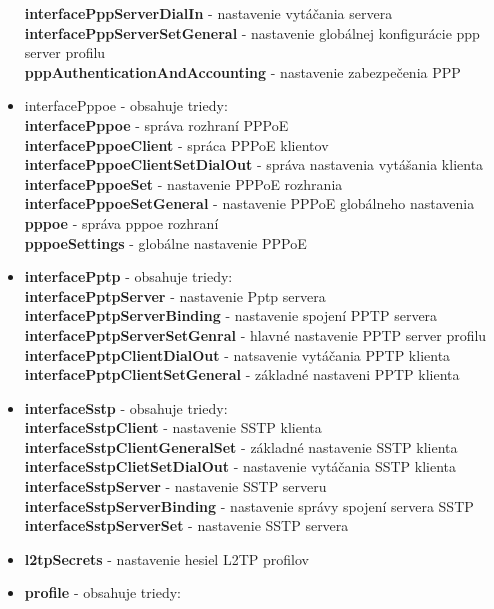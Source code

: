 \begin{itemize}
\textbf{interfacePppServerDialIn} - nastavenie vytáčania servera\\
\textbf{interfacePppServerSetGeneral} - nastavenie globálnej konfigurácie ppp server profilu\\
\textbf{pppAuthenticationAndAccounting} - nastavenie zabezpečenia PPP
\item interfacePppoe - obsahuje triedy:\\
\textbf{interfacePppoe} - správa rozhraní PPPoE\\
\textbf{interfacePppoeClient} - spráca PPPoE klientov\\
\textbf{interfacePppoeClientSetDialOut} - správa nastavenia vytášania klienta\\
\textbf{interfacePppoeSet} - nastavenie PPPoE rozhrania\\
\textbf{interfacePppoeSetGeneral} - nastavenie PPPoE globálneho nastavenia\\
\textbf{pppoe} - správa pppoe rozhraní\\
\textbf{pppoeSettings} - globálne nastavenie PPPoE
\item \textbf{interfacePptp} - obsahuje triedy:\\
\textbf{interfacePptpServer} - nastavenie Pptp servera\\
\textbf{interfacePptpServerBinding} - nastavenie spojení PPTP servera\\
\textbf{interfacePptpServerSetGenral} - hlavné nastavenie PPTP server profilu\\
\textbf{interfacePptpClientDialOut} - natsavenie vytáčania PPTP klienta\\
\textbf{interfacePptpClientSetGeneral} - základné  nastaveni PPTP klienta
\item \textbf{interfaceSstp} - obsahuje triedy:\\
\textbf{interfaceSstpClient} - nastavenie SSTP klienta\\
\textbf{interfaceSstpClientGeneralSet} - základné nastavenie SSTP klienta\\
\textbf{interfaceSstpClietSetDialOut} - nastavenie vytáčania SSTP klienta\\
\textbf{interfaceSstpServer} - nastavenie SSTP serveru\\
\textbf{interfaceSstpServerBinding} - nastavenie správy spojení servera SSTP\\
\textbf{interfaceSstpServerSet} - nastavenie SSTP servera
\item \textbf{l2tpSecrets} - nastavenie hesiel L2TP profilov
\item \textbf{profile} - obsahuje triedy:\\

\end{itemize}
